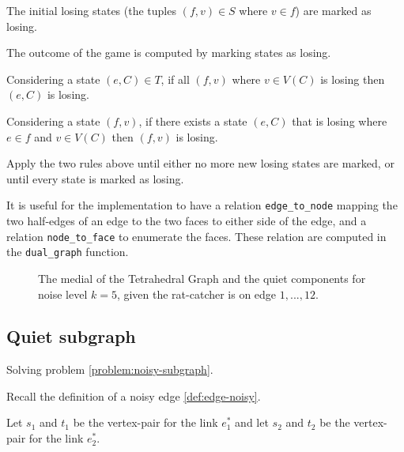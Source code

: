 \documentclass{article}
\begin{document}
			The initial losing states (the tuples $(f,v) \in S$ where $v \in f$) are marked as losing.

			The outcome of the game is computed by marking states as losing.
			
			Considering a state $(e, C) \in T$, if all $(f, v)$ where $v \in V(C)$ is losing then $(e, C)$ is losing.

			Considering a state $(f, v)$, if there exists a state $(e, C)$ that is losing where $e \in f$ and $v \in V(C)$ then $(f, v)$ is losing.

			Apply the two rules above until either no more new losing states are marked, or until every state is marked as losing.

			It is useful for the implementation to have a relation \texttt{edge_to_node} mapping the two half-edges of an edge to the two faces to either side of the edge, and a relation \texttt{node_to_face} to enumerate the faces. These relation are computed in the \texttt{dual_graph} function.


			\begin{figure}[H]
				\centering
				
				
				
				
				
				
				
				
				
				
				
				
				\caption{The medial of the Tetrahedral Graph and the quiet components for noise level $k=5$, given the rat-catcher is on edge $1,...,12$.}
				\label{fig:quiet}
			\end{figure}

		\subsection{Quiet subgraph}

			Solving problem \ref{problem:noisy-subgraph}.

			Recall the definition of a noisy edge \ref{def:edge-noisy}.

			Let $s_1$ and $t_1$ be the vertex-pair for the link $e_1^*$ and let $s_2$ and $t_2$ be the vertex-pair for the link $e_2^*$.
\end{document}
